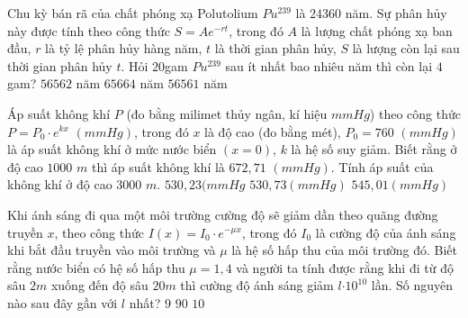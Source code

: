 \begin{ex} %
	Chu kỳ bán rã của chất phóng xạ Polutolium $P{u^{239}}$ là $24360$ năm. Sự phân hủy này được tính theo công thức $S={A{e^{-rt}}}$, trong đó $A$ là lượng chất phóng xạ ban đầu, $ r$ là tỷ lệ phân hủy hàng năm, $ t$ là thời gian phân hủy, $S$ là lượng còn lại sau thời gian phân hủy $ t$. Hỏi $20 $gam $P{u^{239}}$ sau ít nhất bao nhiêu năm thì còn lại $4$ gam?
	 { $56562$ năm} { $65664$ năm} { $56561$ năm}
\end{ex}
\begin{ex} %
	Áp suất không khí $P$ (đo bằng milimet thủy ngân, kí hiệu $mmHg$) theo công thức $P={{P}_0}\cdot {e^{kx}}$ $(mmHg)$, trong đó $x$ là độ cao (đo bằng mét), ${P}_0=760$ $( mmHg)$ là áp suất không khí ở mức nước biển $( x=0 )$, $ k$ là hệ số suy giảm. Biết rằng ở độ cao $1000$ $m$ thì áp suất không khí là $672{,}71$  $( mmHg)$. Tính áp suất của không khí ở độ cao $3000$ $m$.
	 { $530{,}23$$( mmHg$}
	{ $530{,}73$$( mmHg)$} { $545{,}01$$( mmHg)$}
\end{ex}
\begin{ex} %
	Khi ánh sáng đi qua một môi trường cường độ sẽ giảm dần theo quãng đường truyền $ x$, theo công thức $I( x )={I_0} \cdot {e^{-\mu x}}$, trong đó ${I_0}$ là cường độ của ánh sáng khi bắt đầu truyền vào môi trường và $\mu $ là hệ số hấp thu của môi trường đó. Biết rằng nước biển có hệ số hấp thu $\mu =1{,}4$ và người ta tính được rằng khi đi từ độ sâu $2m$ xuống đến độ sâu $20m$ thì cường độ ánh sáng giảm $ l{{\cdot 10}^{10}}$ lần. Số nguyên nào sau đây gần với $ l$ nhất?
	 {\True $9$} { $90$} { $10$}
\end{ex}

